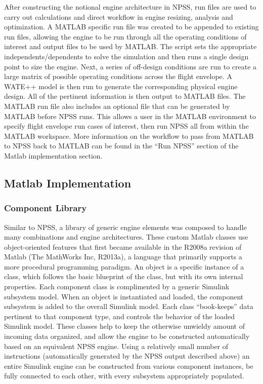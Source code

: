 \documentclass[heading.tex]{subfiles}
\begin{document}
After constructing the notional engine architecture in NPSS, run files are used to carry out
calculations and direct workflow in engine resizing, analysis and optimization. A MATLAB specific
run file was created to be appended to existing run files, allowing the engine to be run through
all the operating conditions of interest and output files to be used by MATLAB. The script sets
the appropriate independents/dependents to solve the simulation and then runs a single design
point to size the engine. Next, a series of off-design conditions are run to create a large matrix
of possible operating conditions across the flight envelope. A WATE++ model is then run to
generate the corresponding physical engine design. All of the pertinent information is then output
to MATLAB files. The MATLAB run file also includes an optional file that can be generated by
MATLAB before NPSS runs. This allows a user in the MATLAB environment to specify flight envelope
run cases of interest, then run NPSS all from within the MATLAB workspace. More information on the
workflow to pass from MATLAB to NPSS back to MATLAB can be found in the “Run NPSS” section of the
Matlab implementation section.

\subsection{Matlab Implementation}

\subsubsection{Component Library}

Similar to NPSS, a library of generic engine elements was composed to handle many combinations and
engine architectures. These custom Matlab classes use object-oriented features that first became
available in the R2008a revision of Matlab (The MathWorks Inc, R2013a), a language that primarily
supports a more procedural programming paradigm. An object is a specific instance of a class,
which follows the basic blueprint of the class, but with its own internal properties. Each
component class is complimented by a generic Simulink subsystem model. When an object is
instantiated and loaded, the component subsystem is added to the overall Simulink model. Each
class “book-keeps” data pertinent to that component type, and controls the behavior of the loaded
Simulink model. These classes help to keep the otherwise unwieldy amount of incoming data
organized, and allow the engine to be constructed automatically based on an equivalent NPSS
engine. Using a relatively small number of instructions (automatically generated by the NPSS
output described above) an entire Simulink engine can be constructed from various component
instances, be fully connected to each other, with every subsystem appropriately populated.
\end{document}
